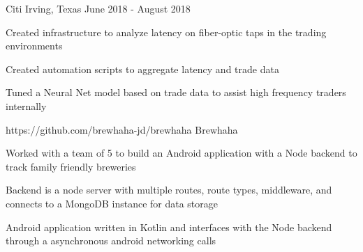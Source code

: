 \documentclass[
    changecolor={0, 38, 58},
]{pranav-resume}
\begin{document}
  {Citi}
  {Irving, Texas}
  {June 2018 - August 2018}
  {
    \begin{cvitems}
		\item{Created infrastructure to analyze latency on fiber-optic taps in the trading environments}
		\item{Created automation scripts to aggregate latency and trade data}
		\item{Tuned a Neural Net model based on trade data to assist high frequency traders internally}
    \end{cvitems}
  }


\cventry
{https://github.com/brewhaha-jd/brewhaha}
{Brewhaha}
	{}
	{}
{
  \begin{cvitems}
	\item{Worked with a team of 5 to build an Android application with a Node backend to track family friendly breweries}
	\item{Backend is a node server with multiple routes, route types, middleware, and connects to a MongoDB instance for 	data storage}
	\item{Android application written in Kotlin and interfaces with the Node backend through a asynchronous android networking calls }
  \end{cvitems}
}
\end{document}
